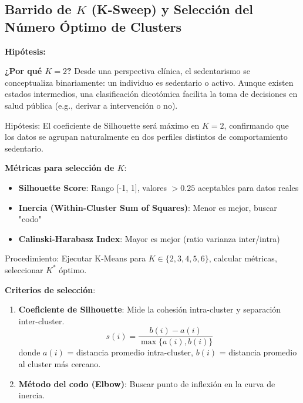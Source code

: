 \documentclass[12pt,letterpaper,twoside]{report}
\begin{document}
\begin{calculobox}
\section{Barrido de $K$ (K-Sweep) y Selección del Número Óptimo de Clusters}

\begin{hipotesisbox}
\textbf{Hipótesis:}

\textbf{¿Por qué $K=2$?} Desde una perspectiva clínica, el sedentarismo se conceptualiza binariamente: un individuo es sedentario o activo. Aunque existen estados intermedios, una clasificación dicotómica facilita la toma de decisiones en salud pública (e.g., derivar a intervención o no).

Hipótesis: El coeficiente de Silhouette será máximo en $K=2$, confirmando que los datos se agrupan naturalmente en dos perfiles distintos de comportamiento sedentario.
\end{hipotesisbox}

\begin{estadisticobox}
\textbf{Métricas para selección de $K$}:

\begin{itemize}[noitemsep]
    \item \textbf{Silhouette Score}: Rango [-1, 1], valores $> 0.25$ aceptables para datos reales
    \item \textbf{Inercia (Within-Cluster Sum of Squares)}: Menor es mejor, buscar "codo"
    \item \textbf{Calinski-Harabasz Index}: Mayor es mejor (ratio varianza inter/intra)
\end{itemize}

Procedimiento: Ejecutar K-Means para $K \in \{2, 3, 4, 5, 6\}$, calcular métricas, seleccionar $K^*$ óptimo.
\end{estadisticobox}

\begin{reglabox}
\textbf{Criterios de selección}:

\begin{enumerate}[noitemsep]
    \item \textbf{Coeficiente de Silhouette}: Mide la cohesión intra-cluster y separación inter-cluster.
    \begin{equation}
    s(i) = \frac{b(i) - a(i)}{\max\{a(i), b(i)\}}
    \end{equation}
    donde $a(i)$ = distancia promedio intra-cluster, $b(i)$ = distancia promedio al cluster más cercano.
    
    \item \textbf{Método del codo (Elbow)}: Buscar punto de inflexión en la curva de inercia.
    

\end{enumerate}
\end{reglabox}
\end{calculobox}
\end{document}
